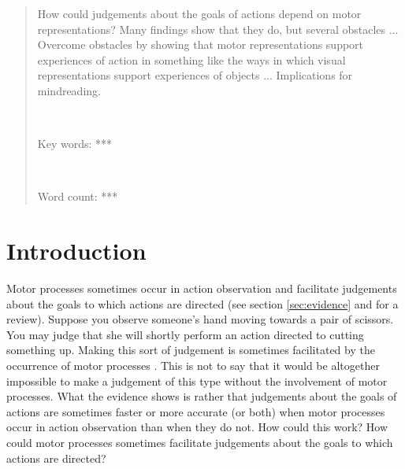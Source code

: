 \documentclass[12pt,\papersize]{extarticle}
\begin{document}
\setlength\footnotesep{1em}


\maketitle
\title{}








\begin{abstract}
\noindent
%
How could judgements about the goals of actions depend on motor representations? Many findings show that they do, but several obstacles ... Overcome obstacles by showing that motor representations support experiences of action in something like the ways in which visual representations support experiences of objects ... Implications for mindreading.
%

\ %

\noindent
Key words: ***

\ %

\noindent
Word count: ***
\end{abstract}









\section{Introduction}


Motor processes sometimes occur in action observation and facilitate judgements about the goals to which actions are directed (see section \vref{sec:evidence} and \citealp{rizzolatti_functional_2010} for a review). 
Suppose you observe someone's hand moving towards a pair of scissors. 
You may judge that she will shortly perform an action directed to cutting something up. 
Making this sort of judgement is sometimes facilitated by the occurrence of motor processes \citep{boria:2009_intention, ortigue:2010_understanding}.  
This is not to say that it would be altogether impossible to make a judgement of this type without the involvement of motor processes. 
What the evidence shows is rather that judgements about the goals of actions are sometimes faster or more accurate (or both) when motor processes occur in action observation than when they do not.
How could this work? 
How could motor processes sometimes facilitate judgements about the goals to which actions are directed?
\end{document}
